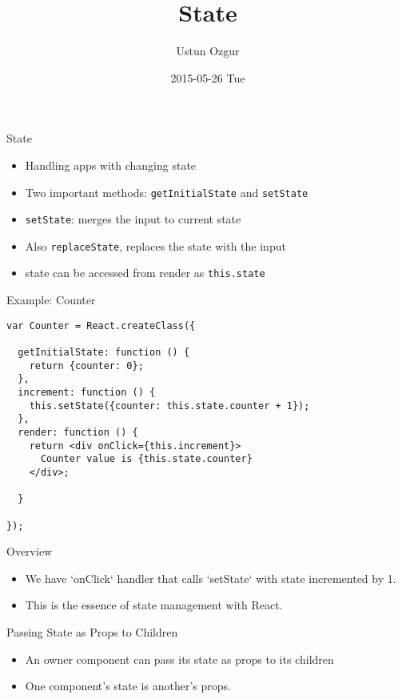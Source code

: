 \documentclass[presentation]{beamer}
\author{Ustun Ozgur}
\date{2015-05-26 Tue}
\title{State}
\begin{document}
\maketitle


\begin{frame}[fragile,label=sec-1]{State}
 \begin{itemize}
\item Handling apps with changing state
\item Two important methods: \texttt{getInitialState} and \texttt{setState}
\item \texttt{setState}: merges the input to current state
\item Also \texttt{replaceState}, replaces the state with the input
\item state can be accessed from render as \texttt{this.state}
\end{itemize}
\end{frame}

\begin{frame}[fragile,label=sec-2]{Example: Counter}
 \begin{verbatim}
var Counter = React.createClass({

  getInitialState: function () {
    return {counter: 0};
  },
  increment: function () {
    this.setState({counter: this.state.counter + 1});
  },
  render: function () {
    return <div onClick={this.increment}>
      Counter value is {this.state.counter}
    </div>;

  }

});
\end{verbatim}
\end{frame}

\begin{frame}[label=sec-3]{Overview}
\begin{itemize}
\item We have `onClick` handler that calls `setState` with state incremented
by 1.
\item This is the essence of state management with React.
\end{itemize}
\end{frame}

\begin{frame}[label=sec-4]{Passing State as Props to Children}
\begin{itemize}
\item An owner component can pass its state as props to its children
\item One component's state is another's props.
\end{itemize}
\end{frame}
\end{document}

